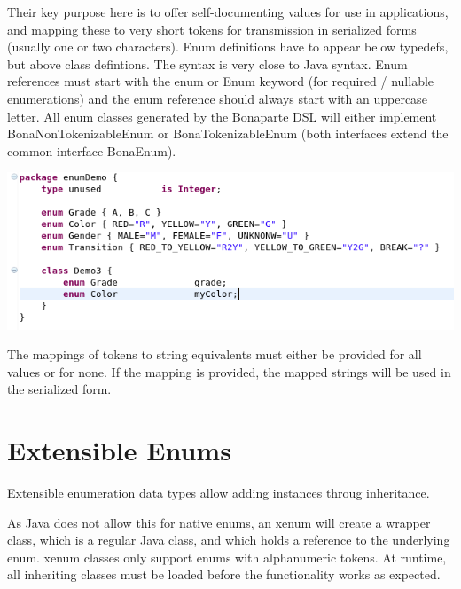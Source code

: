 \documentclass[11pt,a4paper,oneside]{article}
\begin{document}
Their key purpose here is to offer self-documenting values for use in applications, and mapping these to very short tokens
for transmission in serialized forms (usually one or two characters).
Enum definitions have to appear below typedefs, but above class defintions.
The syntax is very close to Java syntax. Enum references must start with the {\ttfamily enum} or {\ttfamily Enum} keyword
 (for required / nullable enumerations) and the enum reference should always start with an uppercase letter.
All enum classes generated by the Bonaparte DSL will either implement {\ttfamily BonaNonTokenizableEnum} or {\ttfamily BonaTokenizableEnum}
(both interfaces extend the common interface {\ttfamily BonaEnum}).

\vspace{2mm}

\hspace{1cm}\includegraphics[scale=0.5]{images/tut1-013-enum.png}

\noindent The mappings of tokens to string equivalents must either be provided for all values or for none. If the mapping is provided, the
mapped strings will be used in the serialized form.


\section{Extensible Enums}
Extensible enumeration data types allow adding instances throug inheritance.

As Java does not allow this for native enums, an {\ttfamily xenum} will create a wrapper class, which is a regular Java class,
and which holds a reference to the underlying enum. {\ttfamily xenum} classes only support {\ttfamily enum}s with alphanumeric
tokens. At runtime, all inheriting classes must be loaded before the functionality works as expected.

\vspace{2mm}
\end{document}
